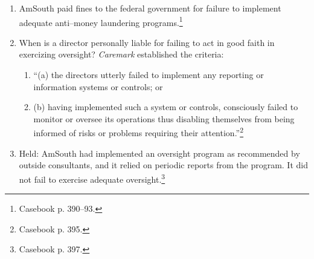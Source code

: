 \begin{enumerate}
    \item AmSouth paid fines to the federal government for failure to 
    implement adequate anti--money laundering programs.\footnote{Casebook p. 
    390--93.}
    \item When is a director personally liable for failing to act in good 
    faith in exercizing oversight? \emph{Caremark} established the criteria:
    \begin{enumerate}
        \item ``(a) the directors utterly failed to implement any reporting or 
        information systems or controls; or
        \item (b) having implemented such a system or controls, consciously 
        failed to monitor or oversee its operations thus disabling themselves 
        from being informed of risks or problems requiring their 
        attention.''\footnote{Casebook p. 395.}
    \end{enumerate}
    \item Held: AmSouth had implemented an oversight program as recommended by 
    outside consultants, and it relied on periodic reports from the program. 
    It did not fail to exercise adequate oversight.\footnote{Casebook p. 397.}
\end{enumerate}
